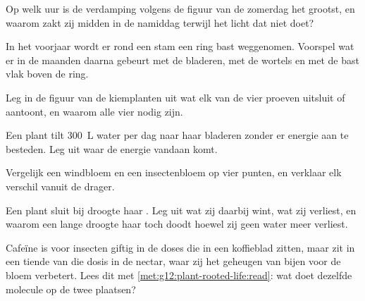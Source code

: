 \begin{exercise}[$\star\star$]\label{exo:g12:plant-rooted-life:7}
Op welk uur is de verdamping volgens de figuur van de zomerdag het
grootst, en waarom zakt zij midden in de namiddag terwijl het licht dat
niet doet?
\end{exercise}

\begin{exercise}[$\star\star$]\label{exo:g12:plant-rooted-life:8}
In het voorjaar wordt er rond een stam een ring bast weggenomen.
Voorspel wat er in de maanden daarna gebeurt met de bladeren, met de
wortels en met de bast vlak boven de ring.
\end{exercise}

\begin{exercise}[$\star\star$]\label{exo:g12:plant-rooted-life:9}
Leg in de figuur van de kiemplanten uit wat elk van de vier proeven
uitsluit of aantoont, en waarom alle vier nodig zijn.
\end{exercise}

\begin{exercise}[$\star\star$]\label{exo:g12:plant-rooted-life:10}
Een plant tilt \qty{300}{L} water per dag naar haar bladeren zonder er
energie aan te besteden. Leg uit waar de energie vandaan komt.
\end{exercise}

\begin{exercise}[$\star\star$]\label{exo:g12:plant-rooted-life:11}
Vergelijk een windbloem en een insectenbloem op vier punten, en verklaar
elk verschil vanuit de drager.
\end{exercise}

\begin{exercise}[$\star\star\star$]\label{exo:g12:plant-rooted-life:12}
Een plant sluit bij droogte haar . Leg uit wat zij daarbij
wint, wat zij verliest, en waarom een lange droogte haar toch doodt
hoewel zij geen water meer verliest.
\end{exercise}

\begin{exercise}[$\star\star\star$]\label{exo:g12:plant-rooted-life:13}
Cafeïne is voor insecten giftig in de doses die in een koffieblad zitten,
maar zit in een tiende van die dosis in de nectar, waar zij het geheugen
van bijen voor de bloem verbetert. Lees dit met
\cref{met:g12:plant-rooted-life:read}: wat doet dezelfde molecule op de
twee plaatsen?
\end{exercise}

